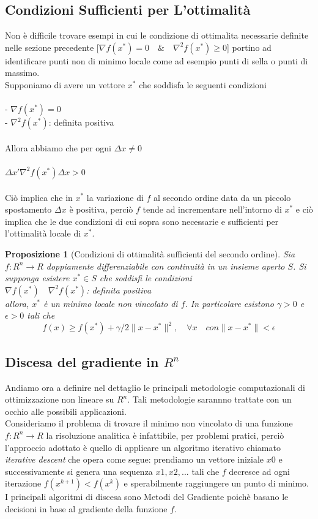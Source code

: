 \documentclass[a4paper, 12pt]{article}
\newtheorem{prop}{Proposizione}
\begin{document}
\subsection{Condizioni Sufficienti per L'ottimalità}
Non è difficile trovare esempi in cui le condizione di ottimalita necessarie definite nelle sezione precedente
[$\nabla f(x^\ast) = 0 \quad \& \quad \nabla^2 f(x^\ast) \geq 0$]
portino ad identificare punti non di minimo locale come ad esempio punti di sella o punti di massimo.\\
Supponiamo di avere un vettore $x^\ast$ che soddisfa le seguenti condizioni\\\\
- $\nabla f(x^\ast) = 0$\\
- $\nabla^2 f(x^\ast)$: definita positiva\\\\
Allora abbiamo che per ogni $\Delta x \neq 0$\\\\
$\Delta x' \nabla^2f(x^\ast) \Delta x > 0$\\\\
Ciò implica che in $x^\ast$ la variazione di $f$ al secondo ordine data da un piccolo spostamento $\Delta x$ è positiva, perciò $f$ tende ad incrementare nell'intorno di $x^\ast$ e ciò implica che le due condizioni di cui sopra sono necessarie e sufficienti per l'ottimalità locale di $x^\ast$.
\begin{prop}[Condizioni di ottimalità sufficienti del secondo ordine] Sia $f:R^n \to R$ doppiamente differenziabile con continuità in un insieme aperto $S$. Si supponga esistere $x^\ast \in S$ che soddisfi le condizioni\\
$\nabla f(x^\ast) \quad \nabla^2 f(x^\ast)$: definita positiva\\
allora, $x^\ast$ è un minimo locale non vincolato di $f$. In particolare esistono $\gamma > 0$ e $\epsilon > 0$ tali che\\
\[ f(x) \geq f(x^\ast) + \gamma/2\parallel x - x^\ast \parallel^2, \quad \forall x \quad con \parallel x - x^\ast \parallel < \epsilon  \]
\end{prop}
\subsection{Discesa del gradiente in $R^n$}
Andiamo ora a definire nel dettaglio le principali metodologie computazionali di ottimizzazione non lineare su $R^n$. Tali metodologie sarannno trattate con un occhio alle possibili applicazioni.\\
Consideriamo il problema di trovare il minimo non vincolato di una funzione $f:R^n \to R$ la risoluzione analitica è infattibile, per problemi pratici, perciò l'approccio adottato è quello di applicare un algoritmo iterativo chiamato \textit{iterative descent} che opera come segue: prendiamo un vettore iniziale $x0$ e successivamente si genera una sequenza $x1, x2, ...$ tali che $f$ decresce ad ogni iterazione $f(x^{k+1}) < f(x^k)$ e sperabilmente raggiungere un punto di minimo.\\
I principali algoritmi di discesa sono Metodi del Gradiente poichè basano le decisioni in base al gradiente della funzione $f$.
\end{document}
